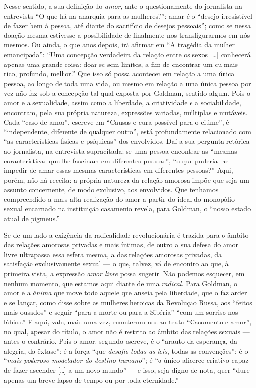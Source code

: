 Nesse sentido, a sua definição do \textit{amor},
ante o questionamento do jornalista na entrevista ``O que há na anarquia
para as mulheres?'': amar é o ``desejo irresistível de fazer bem à
pessoa, até diante do sacrifício de desejos pessoais''; como se nessa
doação mesma estivesse a possibilidade de finalmente nos transfigurarmos
em nós mesmos. Ou ainda, o que anos depois, irá afirmar em ``A tragédia
da mulher emancipada'': ``Uma concepção verdadeira da relação entre os
sexos {[}\ldots{]} conhecerá apenas uma grande coisa: doar-se sem limites,
a fim de encontrar um eu mais rico, profundo, melhor.'' Que isso só
possa acontecer em relação a uma única pessoa, ao longo de toda uma
vida, ou mesmo em relação a uma única pessoa por vez não faz sob a
concepção tal qual exposta por Goldman, sentido algum. Pois o amor e a
sexualidade, assim como a liberdade, a criatividade e a sociabilidade,
encontram, pela sua própria natureza, expressões variadas, múltiplas e
mutáveis. Cada ``caso de amor'', escreve em ``Causas e cura possível
para o ciúme'', é ``independente, diferente de qualquer outro'', está
profundamente relacionado com ``as características físicas e psíquicas''
dos envolvidos. Daí a sua pergunta retórica ao jornalista, na entrevista
supracitada: se uma pessoa encontrar as ``mesmas características que lhe
fascinam em diferentes pessoas'', ``o que poderia lhe impedir de amar
essas mesmas características em diferentes pessoas?'' Aqui, porém, não
há receita: a própria natureza da relação amorosa impõe que seja um
assunto concernente, de modo exclusivo, aos envolvidos. Que tenhamos
compreendido a mais alta realização do amor a partir do ideal do
monopólio sexual encarnado na instituição casamento revela, para
Goldman, o ``nosso estado atual de pigmeus.''

Se de um lado a exigência da radicalidade revolucionária é trazida para
o âmbito das relações amorosas privadas e mais íntimas, de outro a sua
defesa do amor livre ultrapassa essa esfera mesma, a das relações
amorosas privadas, da satisfação exclusivamente sexual --- o que, talvez,
vá de encontro ao que, à primeira vista, a expressão \textit{amor livre}
possa sugerir. Não podemos esquecer, em nenhum momento, que estamos aqui
diante de uma \textit{radical}. Para Goldman, o amor é a \textit{ânima} que
move todo aquele que anseia pela liberdade, que o faz arder e se lançar,
como disse sobre as mulheres heroicas da Revolução Russa, aos ``feitos
mais ousados'' ​​e seguir ``para a morte ou para a Sibéria'' ``com um
sorriso nos lábios.'' E aqui, vale, mais uma vez, remetermo-nos ao texto
``Casamento e amor'', no qual, apesar do título, o amor não é
restrito ao âmbito das relações sexuais --- antes o contrário. Pois o
amor, segundo escreve, é o ``arauto da esperança, da alegria, do
êxtase''; é a força ``que \textit{desafia todas as leis}, todas as
convenções''; é o ``\textit{mais poderoso modelador do destino humano}'';
é ``o único alicerce criativo capaz de fazer ascender {[}\ldots{]} a um
novo mundo'' --- e isso, seja digno de nota, quer ``dure apenas um breve
lapso de tempo ou por toda eternidade.'' 

